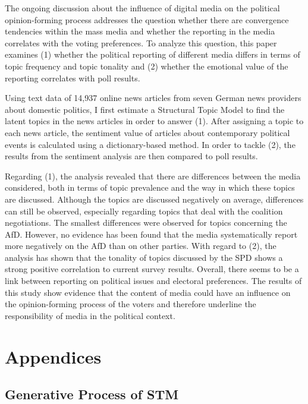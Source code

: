 \documentclass[12pt,a4paper,notitlepage]{article}
\begin{document}
The ongoing discussion about the influence of digital media on the political opinion-forming process addresses the question whether there are convergence tendencies within the mass media and whether the reporting in the media correlates with the voting preferences. To analyze this question, this paper examines (1) whether the political reporting of different media differs in terms of topic frequency and topic tonality and (2) whether the emotional value of the reporting correlates with poll results. 

Using text data of 14,937 online news articles from seven German news providers about domestic politics, I first estimate a Structural Topic Model to find the latent topics in the news articles in order to answer (1). After assigning a topic to each news article, the sentiment value of articles about contemporary political events is calculated using a dictionary-based method. In order to tackle (2), the results from the sentiment analysis are then compared to poll results.

Regarding (1), the analysis revealed that there are differences between the media considered, both in terms of topic prevalence and the way in which these topics are discussed. Although the topics are discussed negatively on average, differences can still be observed, especially regarding topics that deal with the coalition negotiations. The smallest differences were observed for topics concerning the AfD. However, no evidence has been found that the media systematically report more negatively on the AfD than on other parties. With regard to (2), the analysis has shown that the tonality of topics discussed by the SPD shows a strong positive correlation to current survey results. Overall, there seems to be a link between reporting on political issues and electoral preferences. The results of this study show evidence that the content of media could have an influence on the opinion-forming process of the voters and therefore underline the responsibility of media in the political context.

\pagebreak

\printbibliography

\appendix
\section{Appendices}

\subsection{Generative Process of STM}\label{ch_generativeProcess}
\end{document}
